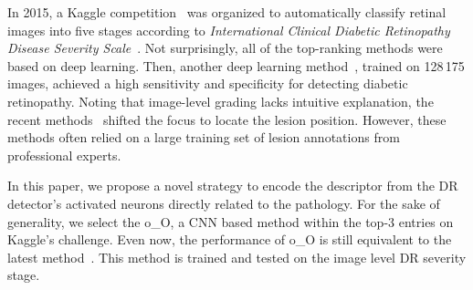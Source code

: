\documentclass[letterpaper]{article} %
\begin{document}
    
     In 2015, a Kaggle competition~\cite{kaggle2016diabetic} was organized to automatically classify retinal images into five stages according to \textit{International Clinical Diabetic Retinopathy Disease Severity Scale}~\cite{aao2002drscale}. Not surprisingly, all of the top-ranking methods were based on deep learning. Then, another deep learning method~\cite{Gulshan2016jama}, trained on  128 175 images, achieved a high sensitivity and specificity for detecting diabetic retinopathy. Noting that image-level grading lacks intuitive explanation, the recent methods~\cite{Yang17MICCAI,wang2017zoom} shifted the focus to locate the lesion position. However, these methods often relied on a large training set of lesion annotations from professional experts.
     
     In this paper, we propose a novel strategy to encode the descriptor from the DR detector's activated neurons directly related to the pathology. For the sake of generality, we select the o\_O\cite{oO2016detector}, a CNN based method within the top-3 entries on Kaggle's challenge. Even now, the performance of o\_O is still equivalent to the latest method~\cite{wang2017zoom}. This method is trained and tested on the image level DR severity stage. 
     
     
     
    
    
    
    
    
    
    
    
    
    
    
    
    
    
    
	
\end{document}
